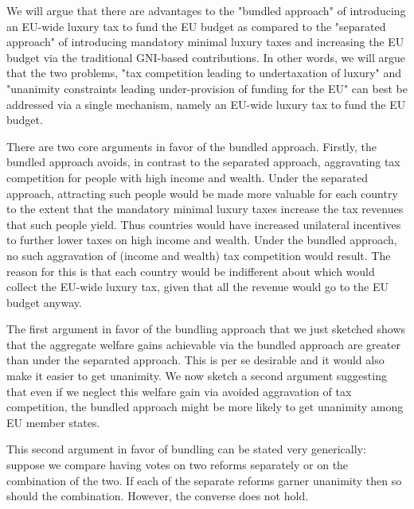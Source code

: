\documentclass[../../main]{subfiles}
\begin{document}
We will argue that there are advantages to the "bundled approach" of introducing an EU-wide luxury tax to fund the EU budget as compared to the "separated approach" of introducing mandatory minimal luxury taxes and increasing the EU budget via the traditional GNI-based contributions. In other words, we will argue that the two problems, "tax competition leading to undertaxation of luxury" and "unanimity constraints leading under-provision of funding for the EU" can best be addressed via a single mechanism, namely an EU-wide luxury tax to fund the EU budget. 

There are two core arguments in favor of the bundled approach. Firstly, the bundled approach avoids, in contrast to the separated approach, aggravating tax competition for people with high income and wealth. Under the separated approach, attracting such people would be made more valuable for each country to the extent that the mandatory minimal luxury taxes increase the tax revenues that such people yield. Thus countries would have increased unilateral incentives to further lower taxes on high income and wealth. Under the bundled approach, no such aggravation of (income and wealth) tax competition would result. The reason for this is that each country would be indifferent about which would collect the EU-wide luxury tax, given that all the revenue would go to the EU budget anyway.

The first argument in favor of the bundling approach that we just sketched shows that the aggregate welfare gains achievable via the bundled approach are greater than under the separated approach. This is per se desirable and it would also make it easier to get unanimity. We now sketch a second argument suggesting that even if we neglect this welfare gain via avoided aggravation of tax competition, the bundled approach might be more likely to get unanimity among EU member states.

This second argument in favor of bundling can be stated very generically: suppose we compare having votes on two reforms separately or on the combination of the two. %
If each of the separate reforms garner unanimity then so should the combination. However, the converse does not hold.
\end{document}
